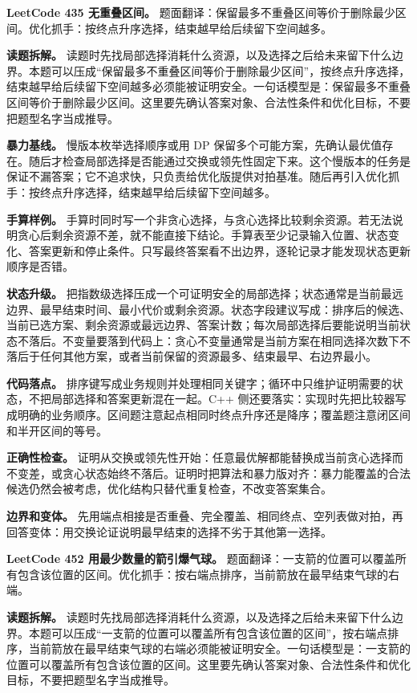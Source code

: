 \noindent\textbf{LeetCode 435 无重叠区间。} 题面翻译：保留最多不重叠区间等价于删除最少区间。优化抓手：按终点升序选择，结束越早给后续留下空间越多。

\textbf{读题拆解。} 读题时先找局部选择消耗什么资源，以及选择之后给未来留下什么边界。本题可以压成“保留最多不重叠区间等价于删除最少区间”，按终点升序选择，结束越早给后续留下空间越多必须能被证明安全。一句话模型是：保留最多不重叠区间等价于删除最少区间。这里要先确认答案对象、合法性条件和优化目标，不要把题型名字当成推导。

\textbf{暴力基线。} 慢版本枚举选择顺序或用 DP 保留多个可能方案，先确认最优值存在。随后才检查局部选择是否能通过交换或领先性固定下来。这个慢版本的任务是保证不漏答案；它不追求快，只负责给优化版提供对拍基准。随后再引入优化抓手：按终点升序选择，结束越早给后续留下空间越多。

\textbf{手算样例。} 手算时同时写一个非贪心选择，与贪心选择比较剩余资源。若无法说明贪心后剩余资源不差，就不能直接下结论。手算表至少记录输入位置、状态变化、答案更新和停止条件。只写最终答案看不出边界，逐轮记录才能发现状态更新顺序是否错。

\textbf{状态升级。} 把指数级选择压成一个可证明安全的局部选择；状态通常是当前最远边界、最早结束时间、最小代价或剩余资源。状态字段建议写成：排序后的候选、当前已选方案、剩余资源或最远边界、答案计数；每次局部选择后要能说明当前状态不落后。不变量要落到代码上：贪心不变量通常是当前方案在相同选择次数下不落后于任何其他方案，或者当前保留的资源最多、结束最早、右边界最小。

\textbf{代码落点。} 排序键写成业务规则并处理相同关键字；循环中只维护证明需要的状态，不把局部选择和答案更新混在一起。C++ 侧还要落实：实现时先把比较器写成明确的业务顺序。区间题注意起点相同时终点升序还是降序；覆盖题注意闭区间和半开区间的等号。

\textbf{正确性检查。} 证明从交换或领先性开始：任意最优解都能替换成当前贪心选择而不变差，或贪心状态始终不落后。证明时把算法和暴力版对齐：暴力能覆盖的合法候选仍然会被考虑，优化结构只替代重复检查，不改变答案集合。

\textbf{边界和变体。} 先用端点相接是否重叠、完全覆盖、相同终点、空列表做对拍，再回答变体：用交换论证说明最早结束的选择不劣于其他第一选择。

\noindent\textbf{LeetCode 452 用最少数量的箭引爆气球。} 题面翻译：一支箭的位置可以覆盖所有包含该位置的区间。优化抓手：按右端点排序，当前箭放在最早结束气球的右端。

\textbf{读题拆解。} 读题时先找局部选择消耗什么资源，以及选择之后给未来留下什么边界。本题可以压成“一支箭的位置可以覆盖所有包含该位置的区间”，按右端点排序，当前箭放在最早结束气球的右端必须能被证明安全。一句话模型是：一支箭的位置可以覆盖所有包含该位置的区间。这里要先确认答案对象、合法性条件和优化目标，不要把题型名字当成推导。

